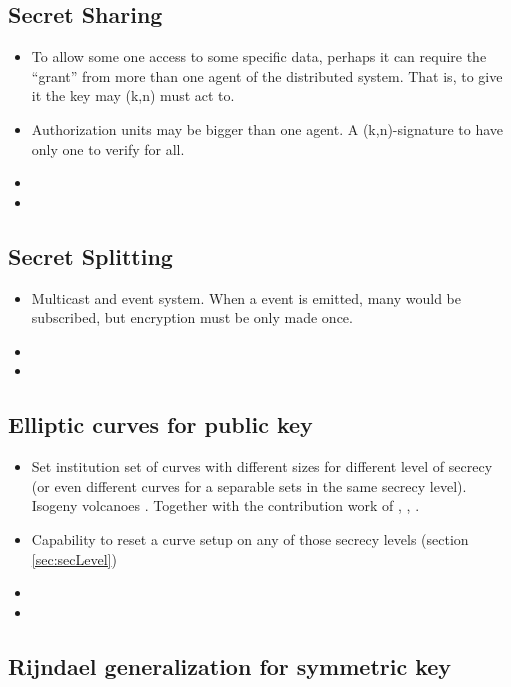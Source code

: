 \documentclass[10pt,a4paper,twoside]{llncs}
\begin{document}
%
\subsection{Secret Sharing \label{sec:secretSharing}}
\begin{itemize}
 \item To allow some one access to some specific data, perhaps it can require the ``grant'' from more than one agent of the distributed system. That is, to give it the key may (k,n) must act to.
 \item Authorization units may be bigger than one agent. A (k,n)-signature to have only one to verify for all.
 \item
 \item
\end{itemize}

\subsection{Secret Splitting \label{sec:secretSplitting}}
\begin{itemize}
 \item Multicast and event system. When a event is emitted, many would be subscribed, but encryption must be only made once.
 \item
 \item
\end{itemize}

%
\subsection{Elliptic curves for public key \label{sec:ecpk}}

\begin{itemize}
 \item Set institution set of curves with different sizes for different level of secrecy (or even different curves for a separable sets in the same secrecy level). Isogeny volcanoes \cite{secRickShareECs}. Together with the contribution work of \cite{JValera11}, \cite{Ramiro05}, \cite{Rosana11}.
 \item Capability to reset a curve setup on any of those secrecy levels (section \ref{sec:secLevel})
 \item 
 \item 
\end{itemize}

%
\subsection{Rijndael generalization for symmetric key \label{sec:gRijndael}}
\end{document}
